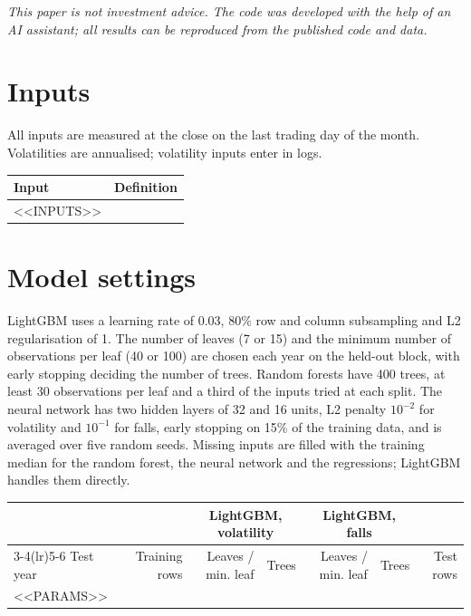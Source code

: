 \documentclass[11pt,a4paper]{article}
\begin{document}
\medskip
{\small\textit{This paper is not investment advice. The code was developed with the help of an AI assistant; all results can be reproduced from the published code and data.}}


\appendix
\section{Inputs}
All inputs are measured at the close on the last trading day of the month. Volatilities are annualised; volatility inputs enter in logs.

{\small\begin{longtable}{>{\raggedright\arraybackslash}p{4.6cm}>{\raggedright\arraybackslash}p{10cm}}\toprule
Input & Definition \\\midrule\endhead
<<INPUTS>>
\bottomrule\end{longtable}}

\section{Model settings}
LightGBM uses a learning rate of 0.03, 80\% row and column subsampling and L2 regularisation of 1. The number of leaves (7 or 15) and the minimum number of observations per leaf (40 or 100) are chosen each year on the held-out block, with early stopping deciding the number of trees. Random forests have 400 trees, at least 30 observations per leaf and a third of the inputs tried at each split. The neural network has two hidden layers of 32 and 16 units, L2 penalty $10^{-2}$ for volatility and $10^{-1}$ for falls, early stopping on 15\% of the training data, and is averaged over five random seeds. Missing inputs are filled with the training median for the random forest, the neural network and the regressions; LightGBM handles them directly.

{\small\begin{longtable}{lrrrrrr}\toprule
& & \multicolumn{2}{c}{LightGBM, volatility} & \multicolumn{2}{c}{LightGBM, falls} & \\\cmidrule(lr){3-4}\cmidrule(lr){5-6}
Test year & Training rows & Leaves / min. leaf & Trees & Leaves / min. leaf & Trees & Test rows \\\midrule\endhead
<<PARAMS>>
\bottomrule\end{longtable}}
\end{document}
